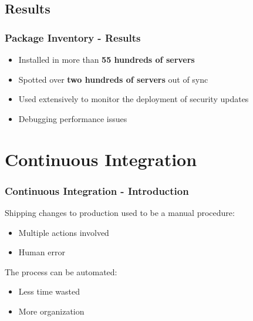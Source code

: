 \documentclass[aspectratio=169]{beamer}
\begin{document}
\subsection{Results}
\begin{frame}
    \frametitle{Package Inventory - Results}
    \begin{itemize}
        \item Installed in more than \textbf{55 hundreds of servers}
        \item Spotted over \textbf{two hundreds of servers} out of sync
        \item Used extensively to monitor the deployment of security updates
        \item Debugging performance issues
    \end{itemize}
\end{frame}

\section{Continuous Integration}

\begin{frame}
    \frametitle{Continuous Integration - Introduction}
    Shipping changes to production used to be a manual procedure:
    \begin{itemize}
        \item Multiple actions involved
        \item Human error
    \end{itemize}

    The process can be automated:
    \begin{itemize}
        \item Less time wasted
        \item More organization
    \end{itemize}
\end{frame}

\end{document}
